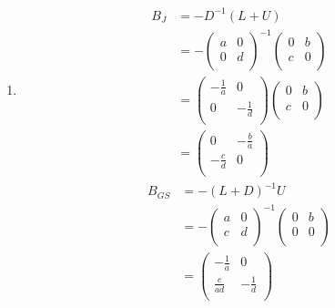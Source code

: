 \documentclass[fleqn, a4paper, 12pt, twoside]{article}
\theoremstyle{definition}
\theoremstyle{theorem}
\begin{document}
\begin{solution}
	\begin{enumerate}[leftmargin=*]
		\item
			\begin{align*}
				B_J &= -D^{-1} (L + U)\\
				&= -
					\begin{pmatrix}
						a & 0 \\
						0 & d \\
					\end{pmatrix}^{-1}
					\begin{pmatrix}
						0 & b \\
						c & 0 \\
					\end{pmatrix}\\
				&=
					\begin{pmatrix}
						-\frac{1}{a} & 0            \\
						0            & -\frac{1}{d} \\
					\end{pmatrix}
					\begin{pmatrix}
						0 & b \\
						c & 0 \\
					\end{pmatrix}\\
				&=
					\begin{pmatrix}
						0            & -\frac{b}{a} \\
						-\frac{c}{d} & 0            \\
					\end{pmatrix}
			\end{align*}
			\begin{align*}
				B_{GS} &= -(L + D)^{-1} U\\
				&= -
					\begin{pmatrix}
						a & 0 \\
						c & d \\
					\end{pmatrix}^{-1}
					\begin{pmatrix}
						0 & b \\
						0 & 0 \\
					\end{pmatrix}\\
				&=
					\begin{pmatrix}
						-\frac{1}{a}  & 0            \\
						\frac{c}{a d} & -\frac{1}{d} \\
					\end{pmatrix}

\end{align*}
\end{enumerate}
\end{solution}
\end{document}
